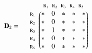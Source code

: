 \documentclass[a4paper,10pt]{article}
\begin{document}
\begin{equation*}
\mathbf{D}_2 = \; \; \; \; \; \begin{matrix}
 & 

\begin{matrix}
\text{\scriptsize $\mathrm{R}_1$} \!\!\! & 
\text{\scriptsize $\mathrm{R}_2$} \!\!\! & 
\text{\scriptsize $\mathrm{R}_3$} \!\!\! & 
\text{\scriptsize $\mathrm{R}_4$} \!\!\! & 
\text{\scriptsize $\mathrm{R}_5$}
\end{matrix}

\\ 

\begin{matrix*}[l]
\text{\scriptsize $\mathrm{R}_1$} \!\!\! \\
\text{\scriptsize $\mathrm{R}_2$} \!\!\! \\
\text{\scriptsize $\mathrm{R}_3$} \!\!\! \\
\text{\scriptsize $\mathrm{R}_4$} \!\!\! \\
\text{\scriptsize $\mathrm{R}_5$} \!\!\!
\end{matrix*}

& 

\begin{pmatrix}
* & 0 & * & * & * \\
* & 0 & * & * & * \\
* & 1 & * & * & * \\
* & 0 & * & * & * \\
* & 0 & * & * & *
\end{pmatrix}

\end{matrix}
\end{equation*}

\bigskip
\end{document}
